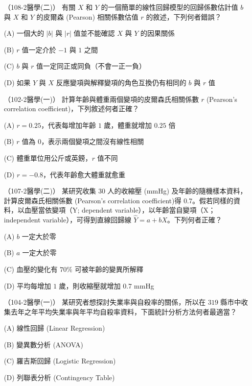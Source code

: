     \begin{docexam}{（108-2醫學(二)）}
        有關 $X$ 和 $Y$ 的一個簡單的線性回歸模型的回歸係數估計值 $b$ 與 $X$ 和 $Y$ 的皮爾森 (Pearson) 相關係數估值 $r$ 的敘述，下列何者錯誤？

        (A) 一個大的 $|b|$ 與 $|r|$ 值並不能確認 $X$ 與 $Y$ 的因果關係
        
        (B) $r$ 值一定介於 $-1$ 與 $1$ 之間

        (C) $b$ 與 $r$ 值一定同正或同負（不會一正一負）
 
        (D) 如果 $Y$ 與 $X$ 反應變項與解釋變項的角色互換仍有相同的 $b$ 與 $r$ 值
    \end{docexam}
    
    \begin{docexam}{（102-2醫學(一)）}
        計算年齡與體重兩個變項的皮爾森氏相關係數 $r$ (Pearson's correlation coefficient)，下列敘述何者正確？

        (A) $r = 0.25$，代表每增加年齡 $1$ 歲，體重就增加 $0.25$ 倍
        
        (B) $r$ 值為 $0$，表示兩個變項之間沒有線性相關

        (C) 體重單位用公斤或英鎊，$r$ 值不同
 
        (D) $r = -0.8$，代表年齡愈大體重就愈重
    \end{docexam}
    
    \begin{docexam}{（107-2醫學(二)）}
        某研究收集 $30$ 人的收縮壓 (mmHg) 及年齡的隨機樣本資料，計算皮爾森氏相關係數 (Pearson's correlation coefficient)得 $0.7$。假若同樣的資料，以血壓當依變項（Y; dependent variable），以年齡當自變項（X；independent variable），可得到直線回歸線 $\hat{Y} = a + b X$。下列何者正確？

        (A) $b$ 一定大於零
        
        (B) $a$ 一定大於零

        (C) 血壓的變化有 $70\%$ 可被年齡的變異所解釋
 
        (D) 平均每增加 $1$ 歲，則收縮壓就增加 $0.7$ mmHg
    \end{docexam}
    
    \begin{docexam}{（104-2醫學(一)）}
        某研究者想探討失業率與自殺率的關係，所以在 $319$ 縣市中收集去年之年平均失業率與年平均自殺率資料，下面統計分析方法何者最適當？

        (A) 線性回歸 (Linear Regression)
        
        (B) 變異數分析 (ANOVA)

        (C) 羅吉斯回歸 (Logistic Regression)
 
        (D) 列聯表分析 (Contingency Table)
    \end{docexam}
    
